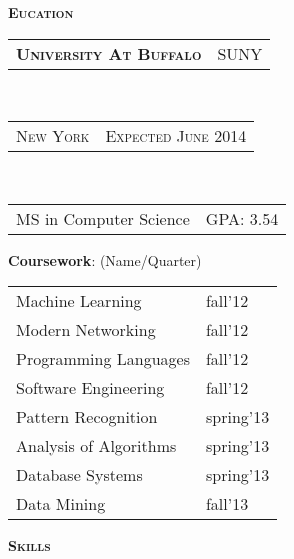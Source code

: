 \documentclass[10pt,a4paper,oneside]{article}
\begin{document}
    \begin{minipage}[t]{0.33\textwidth}
        \vspace{0pt}
        \textcolor{light-gray}{\textbf{\large E\textsc{ucation}}}
        \vspace{10pt}\\
        \begin{tabular}{c|c}
            \textbf{\normalsize U\textsc{niversity} A\textsc{t} B\textsc{uffalo}}
            &\textmd{\normalsize SUNY}
        \end{tabular}\\
        \textcolor{light-gray}{
            \begin{tabular}{c|c}
                {\small N\textsc{ew} Y\textsc{ork}}
                &{\small E\textsc{xpected} J\textsc{une} 2014}
            \end{tabular}
        }\\ 
        \begin{tabular}{c|c}
            {\small MS in Computer Science}
            &{\small GPA: 3.54}
        \end{tabular}
        \vspace{0pt}
        \begin{adjustwidth}{7pt}{0pt}
            {\small \textbf{Coursework}: (Name/Quarter)}\\
        \end{adjustwidth}
        \vspace{-11pt}
        \begin{adjustwidth}{7pt}{0pt}
            \begin{tabular}{ll}
                { \footnotesize Machine Learning } & {\small fall'12}\\                
                { \footnotesize Modern Networking } & {\small fall'12}\\
                { \footnotesize Programming Languages } & {\small fall'12}\\
                { \footnotesize Software Engineering } & {\small fall'12}\\
                { \footnotesize Pattern Recognition } & {\footnotesize spring'13}\\
                { \footnotesize Analysis of Algorithms } & {\footnotesize spring'13}\\
                { \footnotesize Database Systems } & {\footnotesize spring'13}\\
                { \footnotesize Data Mining } & {\footnotesize fall'13}
            \end{tabular}
        \end{adjustwidth}
        \vspace{10pt}
         \textcolor{light-gray}{\textbf{\large S\textsc{kills}}}
        \vspace{10pt}\\

    \end{minipage}
\end{document}
